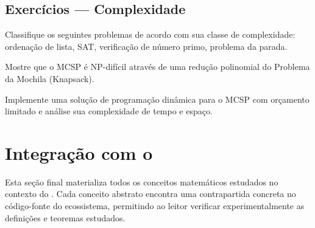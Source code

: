 \subsection{Exercícios — Complexidade}
\begin{exercicio}
Classifique os seguintes problemas de acordo com sua classe de
complexidade: ordenação de lista, SAT, verificação de número primo,
problema da parada.
\end{exercicio}
\begin{exercicio}
Mostre que o MCSP é NP-difícil através de uma redução polinomial do
Problema da Mochila (Knapsack).
\end{exercicio}
\begin{exercicio}
Implemente uma solução de programação dinâmica para o MCSP com
orçamento limitado e análise sua complexidade de tempo e espaço.
\end{exercicio}
\section{Integração com o \opencodeeco{}}
\label{sec:integração}
\nivelbasico
Esta seção final materializa todos os conceitos matemáticos estudados no
contexto do \opencodeeco{}. Cada conceito abstrato encontra uma
contrapartida concreta no código-fonte do ecossistema, permitindo ao leitor
verificar experimentalmente as definições e teoremas estudados.

